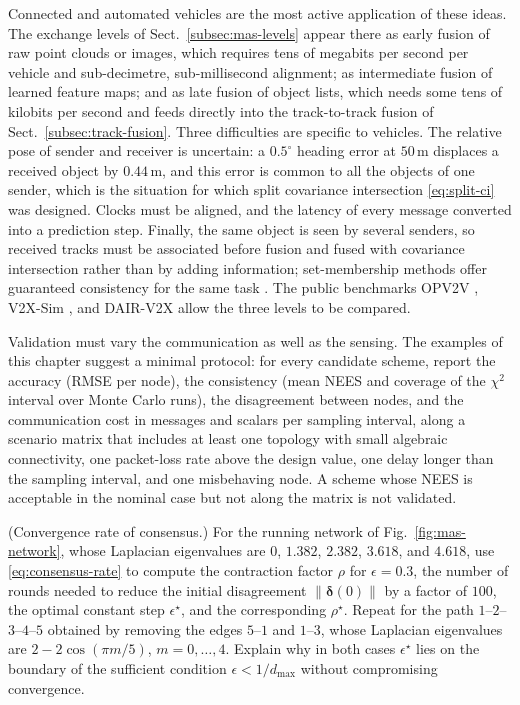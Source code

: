 Connected and automated vehicles are the most active application of these ideas. The exchange levels of Sect.~\ref{subsec:mas-levels} appear there as early fusion of raw point clouds or images, which requires tens of megabits per second per vehicle and sub-decimetre, sub-millisecond alignment; as intermediate fusion of learned feature maps; and as late fusion of object lists, which needs some tens of kilobits per second and feeds directly into the track-to-track fusion of Sect.~\ref{subsec:track-fusion}. Three difficulties are specific to vehicles. The relative pose of sender and receiver is uncertain: a $0.5^{\circ}$ heading error at $50$\,m displaces a received object by $0.44$\,m, and this error is common to all the objects of one sender, which is the situation for which split covariance intersection \eqref{eq:split-ci} was designed. Clocks must be aligned, and the latency of every message converted into a prediction step. Finally, the same object is seen by several senders, so received tracks must be associated before fusion and fused with covariance intersection rather than by adding information; set-membership methods offer guaranteed consistency for the same task \cite{narri2021_set_membership_shared_awareness,narri2025_set_based_awareness}. The public benchmarks OPV2V \cite{xu2022_opv2v}, V2X-Sim \cite{li2022_v2xsim}, and DAIR-V2X \cite{yu2022_dairv2x} allow the three levels to be compared.

Validation must vary the communication as well as the sensing. The examples of this chapter suggest a minimal protocol: for every candidate scheme, report the accuracy (RMSE per node), the consistency (mean NEES and coverage of the $\chi^{2}$ interval over Monte Carlo runs), the disagreement between nodes, and the communication cost in messages and scalars per sampling interval, along a scenario matrix that includes at least one topology with small algebraic connectivity, one packet-loss rate above the design value, one delay longer than the sampling interval, and one misbehaving node. A scheme whose NEES is acceptable in the nominal case but not along the matrix is not validated.

\problemsection

\begin{prob}\label{prob:ch06:1}
(Convergence rate of consensus.) For the running network of Fig.~\ref{fig:mas-network}, whose Laplacian eigenvalues are $0$, $1.382$, $2.382$, $3.618$, and $4.618$, use \eqref{eq:consensus-rate} to compute the contraction factor $\rho$ for $\epsilon=0.3$, the number of rounds needed to reduce the initial disagreement $\|\boldsymbol{\delta}(0)\|$ by a factor of $100$, the optimal constant step $\epsilon^{\star}$, and the corresponding $\rho^{\star}$. Repeat for the path $1$--$2$--$3$--$4$--$5$ obtained by removing the edges $5$--$1$ and $1$--$3$, whose Laplacian eigenvalues are $2-2\cos(\pi m/5)$, $m=0,\dots,4$. Explain why in both cases $\epsilon^{\star}$ lies on the boundary of the sufficient condition $\epsilon<1/d_{\max}$ without compromising convergence.
\end{prob}

